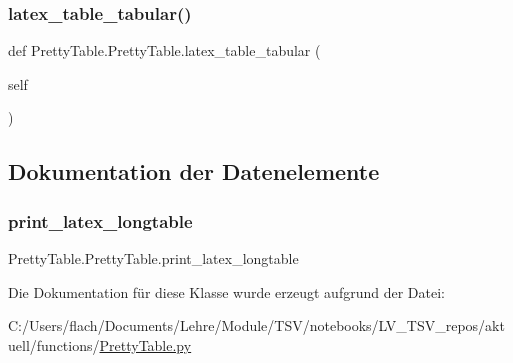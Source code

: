 \mbox{\label{class_pretty_table_1_1_pretty_table_a47ca8c24fce0d42d04f689931f01ba3a}} 
\subsubsection{\texorpdfstring{latex\+\_\+table\+\_\+tabular()}{latex\_table\_tabular()}}
{\footnotesize\ttfamily def Pretty\+Table.\+Pretty\+Table.\+latex\+\_\+table\+\_\+tabular (\begin{DoxyParamCaption}\item[{}]{self }\end{DoxyParamCaption})}



\subsection{Dokumentation der Datenelemente}
\mbox{\label{class_pretty_table_1_1_pretty_table_a871a7b01d3f42d1a0e053a2cd1a98dbc}} 
\subsubsection{\texorpdfstring{print\+\_\+latex\+\_\+longtable}{print\_latex\_longtable}}
{\footnotesize\ttfamily Pretty\+Table.\+Pretty\+Table.\+print\+\_\+latex\+\_\+longtable}



Die Dokumentation für diese Klasse wurde erzeugt aufgrund der Datei\+:\begin{DoxyCompactItemize}
\item 
C\+:/\+Users/flach/\+Documents/\+Lehre/\+Module/\+T\+S\+V/notebooks/\+L\+V\+\_\+\+T\+S\+V\+\_\+repos/aktuell/functions/\mbox{\hyperlink{_pretty_table_8py}{Pretty\+Table.\+py}}\end{DoxyCompactItemize}
